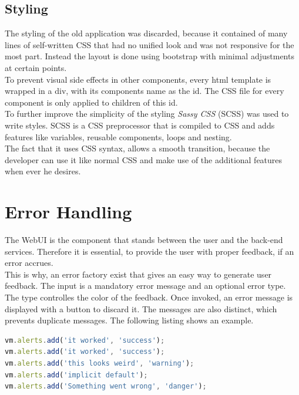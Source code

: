 \subsection{Styling}
\label{sec:styling}
The styling of the old application was discarded, because it contained of many lines of self-written CSS that had no unified look and was not responsive for the most part. Instead the layout is done using bootstrap with minimal adjustments at certain points.\\
To prevent visual side effects in other components, every html template is wrapped in a div, with its components name as the id. The CSS file for every component is only applied to children of this id.\\
To further improve the simplicity of the styling \textit{Sassy CSS} (SCSS) was used to write styles. SCSS is a CSS preprocessor that is compiled to CSS and adds features like variables, reusable components, loops and nesting.\\
The fact that it uses CSS syntax, allows a smooth transition, because the developer can use it like normal CSS and make use of the additional features when ever he desires.



\section{Error Handling}
The WebUI is the component that stands between the user and the back-end services. Therefore it is essential, to provide the user with proper feedback, if an error accrues.\\
This is why, an error factory exist that gives an easy way to generate user feedback. The input is a mandatory error message and an optional error type. The type controlles the color of the feedback. Once invoked, an error message is displayed with a button to discard it. The messages are also distinct, which prevents duplicate messages. The following listing shows an example. 
\begin{lstlisting}[language=javascript, caption=error handling]
vm.alerts.add('it worked', 'success');
vm.alerts.add('it worked', 'success');
vm.alerts.add('this looks weird', 'warning');
vm.alerts.add('implicit default');
vm.alerts.add('Something went wrong', 'danger');
\end{lstlisting}

